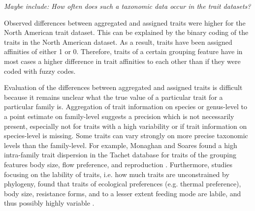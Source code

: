 \documentclass{article}
\begin{document}
\textit{\color{blue} Maybe include: How often does such a taxonomic data occur in the trait datasets?}

Observed differences between aggregated and assigned traits were higher for the North American trait dataset. This can be explained by the binary coding of the traits in the North American dataset. As a result, traits have been assigned affinities of either 1 or 0.  Therefore, traits of a certain grouping feature have in most cases a higher difference in trait affinities to each other than if they were coded with fuzzy codes.

Evaluation of the differences between aggregated and assigned traits is difficult because it remains unclear what the true value of a particular trait for a particular family is. Aggregation of trait information on species or genus-level to a point estimate on family-level suggests a precision which is not necessarily present, especially not for traits with a high variability or if trait information on species-level is missing. Some traits can vary strongly on more precise taxonomic levels than the family-level. For example, Monaghan and Soares found a high intra-family trait dispersion in the Tachet database for traits of the grouping features body size, flow preference, and reproduction \cite{monaghan_improving_2013}. Furthermore, studies focusing on the lability of traits, i.e. how much traits are unconstrained by phylogeny, found that traits of ecological preferences (e.g. thermal preference), body size, resistance forms, and to a lesser extent feeding mode are labile, and thus possibly highly variable \cite{poff_functional_2006, wilkes_traitbased_2020}.
\end{document}
